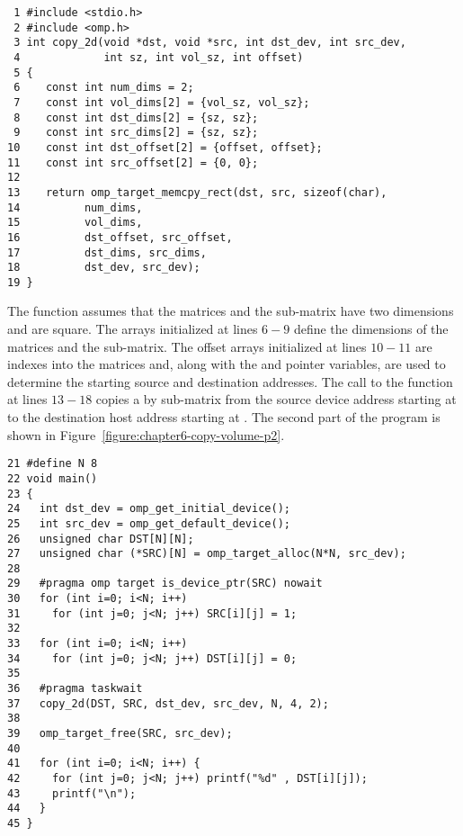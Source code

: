 \begin{figure*}[!tb]
\begin{verbatim}
 1 #include <stdio.h>
 2 #include <omp.h>
 3 int copy_2d(void *dst, void *src, int dst_dev, int src_dev,
 4             int sz, int vol_sz, int offset)
 5 {
 6    const int num_dims = 2;
 7    const int vol_dims[2] = {vol_sz, vol_sz};
 8    const int dst_dims[2] = {sz, sz};
 9    const int src_dims[2] = {sz, sz};
10    const int dst_offset[2] = {offset, offset};
11    const int src_offset[2] = {0, 0};
12 
13    return omp_target_memcpy_rect(dst, src, sizeof(char),
14          num_dims,
15          vol_dims,
16          dst_offset, src_offset,
17          dst_dims, src_dims,
18          dst_dev, src_dev);
19 }
\end{verbatim}
\caption{ \textbf {Copy a sub-matrix from a source matrix to a destination matrix - part 1} -- \small
          Two-dimensional square matrices are assumed.
          Copy a sub-matrix from \texttt{src[0][0]} to \texttt{dst[offset][offset]}.
         }
\label{figure:chapter6-copy-volume}
\end{figure*}

The  function assumes that the matrices and the sub-matrix have two dimensions and are square.  
The arrays initialized at lines $6-9$ define the dimensions of the matrices 
and the sub-matrix.  
The offset arrays initialized at lines $10-11$ are indexes into
the matrices and, along with the  and  pointer variables, are used to determine the starting source
and destination addresses.
The call to the  function at lines $13-18$ copies a  by 
sub-matrix from the source device address starting at  to the destination host address starting at .
The second part of the program is shown in Figure~\ref{figure:chapter6-copy-volume-p2}.

\begin{figure*}[!tb]
\begin{verbatim}
21 #define N 8
22 void main()
23 {
24   int dst_dev = omp_get_initial_device();
25   int src_dev = omp_get_default_device();
26   unsigned char DST[N][N];
27   unsigned char (*SRC)[N] = omp_target_alloc(N*N, src_dev);
28 
29   #pragma omp target is_device_ptr(SRC) nowait
30   for (int i=0; i<N; i++)
31     for (int j=0; j<N; j++) SRC[i][j] = 1;
32 
33   for (int i=0; i<N; i++)
34     for (int j=0; j<N; j++) DST[i][j] = 0;
35 
36   #pragma taskwait
37   copy_2d(DST, SRC, dst_dev, src_dev, N, 4, 2);
38 
39   omp_target_free(SRC, src_dev);
40 
41   for (int i=0; i<N; i++) {
42     for (int j=0; j<N; j++) printf("%d" , DST[i][j]);
43     printf("\n");
44   }
45 }
\end{verbatim}
\caption{ \textbf {Copy a sub-matrix from a source matrix to a destination matrix - part 2} -- \small
          Allocate and initialize an $8x8$ \texttt{SRC} matrix on an accelerator and fill it with $1$.
          Initialize an $8x8$ \texttt{DST} matrix on the host and fill it with $0$.
          Copy a $4x4$ sub-matrix from \texttt{SRC[0][0]} to \texttt{DST[2][2]}.
         }
\label{figure:chapter6-copy-volume-p2}
\end{figure*}

